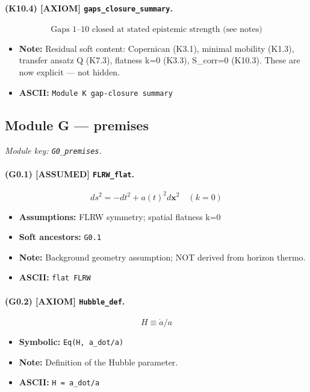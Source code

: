 \documentclass[11pt,a4paper]{article}
\theoremstyle{remark}\newtheorem*{caution}{Caution}
\newcommand{\tagbox}[1]{\textsc{[#1]}}
\begin{document}
\paragraph{(K10.4) \tagbox{AXIOM} \texttt{gaps\_closure\_summary}.}
\begin{equation}
\text{Gaps 1--10 closed at stated epistemic strength (see notes)}
\tag{K10.4}
\end{equation}
\begin{itemize}\setlength{\itemsep}{0.12em}
\item \textbf{Note:} Residual soft content: Copernican (K3.1), minimal mobility (K1.3), transfer ansatz Q (K7.3), flatness k=0 (K3.3), S\_corr=0 (K10.3). These are now explicit — not hidden.
\item \textbf{ASCII:} \texttt{Module K gap-closure summary}
\end{itemize}
\subsection{Module G --- premises}
\textit{Module key: \texttt{G0\_premises}.}
\paragraph{(G0.1) \tagbox{ASSUMED} \texttt{FLRW\_flat}.}
\begin{equation}
ds^2=-dt^2+a(t)^2 d\mathbf{x}^2\quad(k=0)
\tag{G0.1}
\end{equation}
\begin{itemize}\setlength{\itemsep}{0.12em}
\item \textbf{Assumptions:} FLRW symmetry; spatial flatness k=0
\item \textbf{Soft ancestors:} \texttt{G0.1}
\item \textbf{Note:} Background geometry assumption; NOT derived from horizon thermo.
\item \textbf{ASCII:} \texttt{flat FLRW}
\end{itemize}
\paragraph{(G0.2) \tagbox{AXIOM} \texttt{Hubble\_def}.}
\begin{equation}
H\equiv\dot a/a
\tag{G0.2}
\end{equation}
\begin{itemize}\setlength{\itemsep}{0.12em}
\item \textbf{Symbolic:} \texttt{Eq(H, a\_dot/a)}
\item \textbf{Note:} Definition of the Hubble parameter.
\item \textbf{ASCII:} \texttt{H = a\_dot/a}
\end{itemize}
\end{document}
